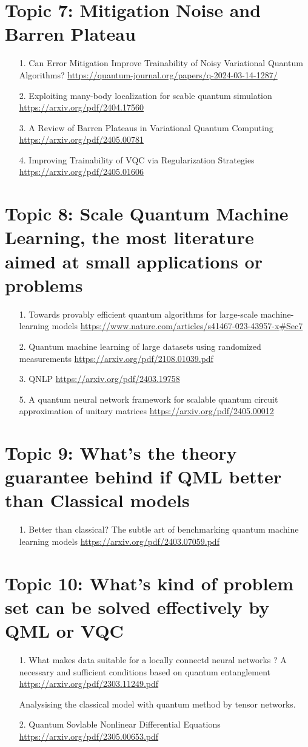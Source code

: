 \documentclass[12pt, oneside]{article}   	%
\begin{document}
\section{Topic 7: Mitigation Noise and Barren Plateau}
\begin{itemize}
\item[1. ] Can Error Mitigation Improve Trainability of Noisy Variational Quantum Algorithms? \url{https://quantum-journal.org/papers/q-2024-03-14-1287/}
\item [2. ] Exploiting many-body localization for scable quantum simulation \url{https://arxiv.org/pdf/2404.17560}
\item[3. ] A Review of Barren Plateaus in Variational Quantum Computing \url{https://arxiv.org/pdf/2405.00781}
\item[4. ] Improving Trainability of VQC via Regularization Strategies \url{https://arxiv.org/pdf/2405.01606}
\end{itemize}
\section{Topic 8: Scale Quantum Machine Learning, the most literature aimed at small applications or problems}
\begin{itemize}
\item[1. ] Towards provably efficient quantum algorithms for large-scale machine-learning models \url{https://www.nature.com/articles/s41467-023-43957-x#Sec7}
\item[2. ] Quantum machine learning of large datasets using randomized measurements \url{https://arxiv.org/pdf/2108.01039.pdf}
\item[3. ] QNLP \url{https://arxiv.org/pdf/2403.19758}
\item[5. ] A quantum neural network framework for scalable quantum circuit approximation of unitary matrices \url{https://arxiv.org/pdf/2405.00012}
\end{itemize}
\section{Topic 9: What's the theory guarantee behind if QML better than Classical models}
\begin{itemize}
\item[1. ]Better than classical? The subtle art of benchmarking	quantum machine learning models \url{https://arxiv.org/pdf/2403.07059.pdf}
\end{itemize}
\section{Topic 10: What's kind of problem set can be solved effectively  by QML or VQC}
\begin{itemize}
	\item [1.] What makes data suitable for a locally connectd neural networks ? A necessary and sufficient conditions based on quantum entanglement \url{https://arxiv.org/pdf/2303.11249.pdf}
	\par Analysising the classical model with quantum method by tensor networks.
	\item[2. ] Quantum Sovlable Nonlinear Differential Equations \url{https://arxiv.org/pdf/2305.00653.pdf}
\end{itemize}
\end{document}
